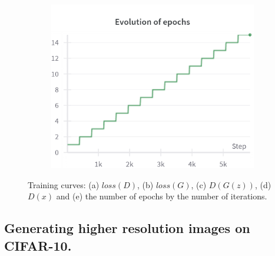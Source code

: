 \begin{figure}[H]
    \begin{subfigure}{0.45\textwidth}
        \centering
        \includegraphics[width=0.95\linewidth]{cifar10/32/epochs.png}
        \caption{}
        \label{subfig:cifar10/32/epochs}
    \end{subfigure}%

    \caption{Training curves: (a) $loss(D)$, (b) $loss(G)$, (c) $D(G(z))$, (d) $D(x)$ and (e) the number of epochs by the number of iterations.}
    \label{fig:cifar10_32_curves}
\end{figure}

\subsection{Generating higher resolution images on CIFAR-10.} \label{appendix:cifar10_64}


